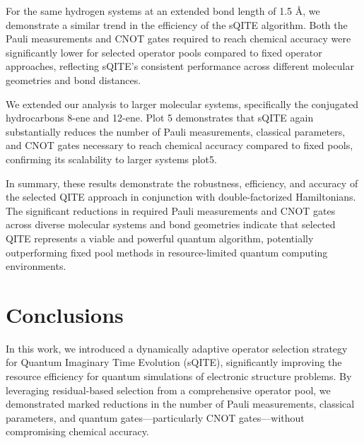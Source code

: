 \documentclass[aip,jcp,amsmath,amssymb, reprint]{revtex4-1}
\begin{document}
For the same hydrogen systems at an extended bond length of 1.5 Å, we demonstrate a similar trend in the efficiency of the sQITE algorithm. Both the Pauli measurements and CNOT gates required to reach chemical accuracy were significantly lower for selected operator pools compared to fixed operator approaches, reflecting sQITE's consistent performance across different molecular geometries and bond distances.

We extended our analysis to larger molecular systems, specifically the conjugated hydrocarbons 8-ene and 12-ene. Plot 5 demonstrates that sQITE again substantially reduces the number of Pauli measurements, classical parameters, and CNOT gates necessary to reach chemical accuracy compared to fixed pools, confirming its scalability to larger systems {plot5}.


In summary, these results demonstrate the robustness, efficiency, and accuracy of the selected QITE approach in conjunction with double-factorized Hamiltonians. The significant reductions in required Pauli measurements and CNOT gates across diverse molecular systems and bond geometries indicate that selected QITE represents a viable and powerful quantum algorithm, potentially outperforming fixed pool methods in resource-limited quantum computing environments.
\section{Conclusions}
In this work, we introduced a dynamically adaptive operator selection strategy for Quantum Imaginary Time Evolution (sQITE), significantly improving the resource efficiency for quantum simulations of electronic structure problems. By leveraging residual-based selection from a comprehensive operator pool, we demonstrated marked reductions in the number of Pauli measurements, classical parameters, and quantum gates—particularly CNOT gates—without compromising chemical accuracy.
\end{document}
